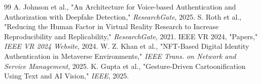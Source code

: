 \documentclass[conference]{IEEEtran}
\begin{document}
\begin{thebibliography}{99}
 A. Johnson et al., "An Architecture for Voice-based Authentication and Authorization with Deepfake Detection," \textit{ResearchGate}, 2025.
 S. Roth et al., "Reducing the Human Factor in Virtual Reality Research to Increase Reproducibility and Replicability," \textit{ResearchGate}, 2021.
 IEEE VR 2024, "Papers," \textit{IEEE VR 2024 Website}, 2024.
 W. Z. Khan et al., "NFT-Based Digital Identity Authentication in Metaverse Environments," \textit{IEEE Trans. on Network and Service Management}, 2025.
 K. Gupta et al., "Gesture-Driven Cartoonification Using Text and AI Vision," \textit{IEEE}, 2025.

\end{thebibliography}
\end{document}

